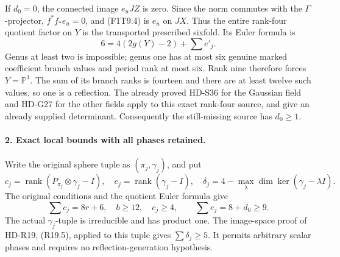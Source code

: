 If \(d_0=0\), the connected image \(e_uJZ\) is zero. Since
the norm commutes with the \(\Gamma\)-projector,
\(f^*f_*e_u=0\), and (F1T9.4) is \(e_u\) on \(JX\).
Thus the entire rank-four quotient factor on \(Y\) is the
transported prescribed sixfold. Its Euler formula is
\[
             6=4(2g(Y)-2)+\sum e'_j .
 \tag{F1T9.5}
\]
Genus at least two is impossible; genus one has at most six
genuine marked coefficient branch values and period rank at
most six. Rank nine therefore forces \(Y=\mathbb P^1\).
The sum of its branch ranks is fourteen and there are at least
twelve such values, so one is a reflection. The already proved
HD-S36 for the Gaussian field and HD-G27 for the other fields
apply to this exact rank-four source, and give an already
supplied determinant. Consequently the still-missing source
has \(d_0\ge1\).

\paragraph{2. Exact local bounds with all phases retained.}
Write the original sphere tuple as \((\pi_j,\gamma_j)\), and put
\[
 c_j=\operatorname{rank}(P_{\pi_j}\otimes\gamma_j-I),\quad
 e_j=\operatorname{rank}(\gamma_j-I),\quad
 \delta_j=4-\max_\lambda\dim\ker(\gamma_j-\lambda I).
 \tag{F1T9.6}
\]
The original conditions and the quotient Euler formula give
\[
 \sum c_j=8r+6,\quad b\ge12,\quad c_j\ge4,\qquad
          \sum e_j=8+d_0\ge9.
 \tag{F1T9.7}
\]
The actual \(\gamma_j\)-tuple is irreducible and has product one.
The image-space proof of HD-R19, (R19.5), applied to this tuple
gives \(\sum\delta_j\ge5\). It permits arbitrary scalar phases
and requires no reflection-generation hypothesis.

